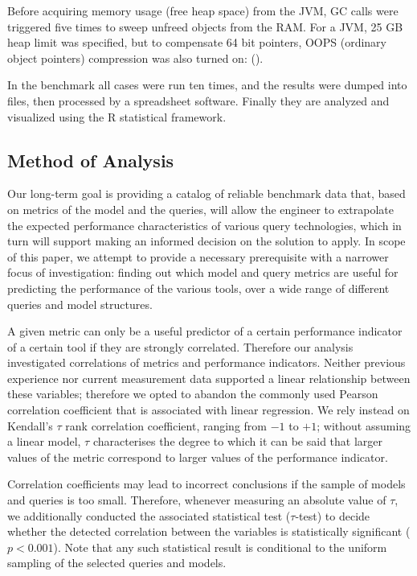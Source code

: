 Before acquiring memory usage (free heap space) from the JVM, GC calls were
triggered five times to sweep unfreed objects from the RAM. For a JVM, 25 GB
heap limit was specified, but to compensate 64 bit pointers, OOPS (ordinary
object pointers) compression was also turned on: ().

In  the benchmark all cases were run ten times, and the results were dumped into
files, then processed by a spreadsheet software. Finally they are analyzed and
visualized using the R statistical framework.

\subsection{Method of Analysis}
Our long-term goal is providing a catalog of reliable benchmark data that,
based on metrics of the model and the queries, will allow the engineer to
extrapolate the expected performance characteristics of various query
technologies, which in turn will support making an informed decision on the
solution to apply. In scope of this paper, we attempt to provide a necessary
prerequisite with a narrower focus of investigation: finding out which model and
query metrics are useful for predicting the performance 
of the various tools, over a wide range of different queries and model
structures.

A given metric can only be a useful predictor of a certain performance indicator
of a certain tool if they are strongly correlated. Therefore our analysis
investigated correlations of metrics and performance indicators. Neither
previous experience nor current measurement data supported a linear relationship
between these variables; therefore we opted to abandon the commonly used Pearson
correlation coefficient that is associated with linear regression. We rely
instead on Kendall's $\tau$ %
 rank correlation coefficient, ranging from $-1$ to $+1$; without assuming a
 linear model, $\tau$ characterises the degree to which it can be said that
 larger values of the metric correspond to larger values of the performance
 indicator.

Correlation coefficients may lead to incorrect conclusions if the sample of
models and queries is too small. Therefore, whenever measuring an absolute value
of $\tau$, we additionally conducted the associated statistical test
($\tau$-test) to decide whether the detected correlation between the variables
is statistically significant ($p<0.001$). Note that any such statistical result
is conditional to the uniform sampling of the selected queries and models.


